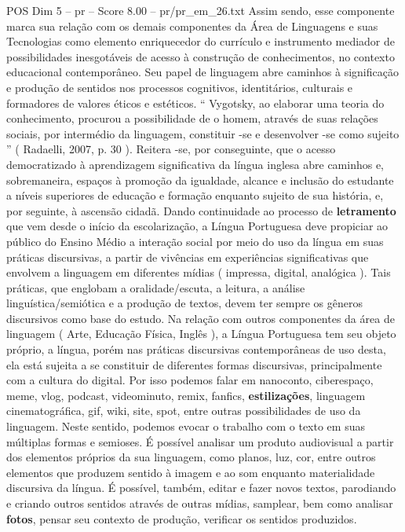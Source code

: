 \begin{textsample}{POS Dim 5 – pr – Score 8.00 – pr/pr\_em\_26.txt}
Assim sendo, esse componente marca sua relação com os demais componentes da Área de Linguagens e suas Tecnologias como elemento enriquecedor do currículo e instrumento mediador de possibilidades inesgotáveis de acesso à construção de conhecimentos, no contexto educacional contemporâneo.
Seu papel de linguagem abre caminhos à significação e produção de sentidos nos processos cognitivos, identitários, culturais e formadores de valores éticos e estéticos. “ Vygotsky, ao elaborar uma teoria do conhecimento, procurou a possibilidade de o homem, através de suas relações sociais, por intermédio da linguagem, constituir -se e desenvolver -se como sujeito ” ( Radaelli, 2007, p. 30 ).
Reitera -se, por conseguinte, que o acesso democratizado à aprendizagem significativa da língua inglesa abre caminhos e, sobremaneira, espaços à promoção da igualdade, alcance e inclusão do estudante a níveis superiores de educação e formação enquanto sujeito de sua história, e, por seguinte, à ascensão cidadã.
Dando continuidade ao processo de \textbf{letramento} que vem desde o início da escolarização, a Língua Portuguesa deve propiciar ao público do Ensino Médio a interação social por meio do uso da língua em suas práticas discursivas, a partir de vivências em experiências significativas que envolvem a linguagem em diferentes mídias ( impressa, digital, analógica ).
Tais práticas, que englobam a oralidade/escuta, a leitura, a análise linguística/semiótica e a produção de textos, devem ter sempre os gêneros discursivos como base do estudo.
Na relação com outros componentes da área de linguagem ( Arte, Educação Física, Inglês ), a Língua Portuguesa tem seu objeto próprio, a língua, porém nas práticas discursivas contemporâneas de uso desta, ela está sujeita a se constituir de diferentes formas discursivas, principalmente com a cultura do digital.
Por isso podemos falar em nanoconto, ciberespaço, meme, vlog, podcast, videominuto, remix, fanfics, \textbf{estilizações}, linguagem cinematográfica, gif, wiki, site, spot, entre outras possibilidades de uso da linguagem.
Neste sentido, podemos evocar o trabalho com o texto em suas múltiplas formas e semioses.
É possível analisar um produto audiovisual a partir dos elementos próprios da sua linguagem, como planos, luz, cor, entre outros elementos que produzem sentido à imagem e ao som enquanto materialidade discursiva da língua.
É possível, também, editar e fazer novos textos, parodiando e criando outros sentidos através de outras mídias, samplear, bem como analisar \textbf{fotos}, pensar seu contexto de produção, verificar os sentidos produzidos.

\end{textsample}
